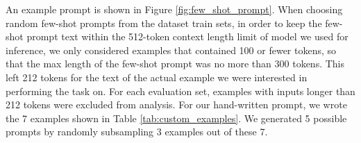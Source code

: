 An example prompt is shown in Figure \ref{fig:few_shot_prompt}.
When choosing random few-shot prompts from the dataset train sets, in order to keep the few-shot prompt text within the 512-token context length limit of model we used for inference, we only considered examples that contained 100 or fewer tokens, so that the max length of the few-shot prompt was no more than 300 tokens.
This left 212 tokens for the text of the actual example we were interested in performing the \FitB{} task on.
For each evaluation set, examples with inputs longer than 212 tokens were excluded from analysis.
For our hand-written prompt, we wrote the 7 examples shown in Table \ref{tab:custom_examples}.
We generated 5 possible prompts by randomly subsampling 3 examples out of these 7.


